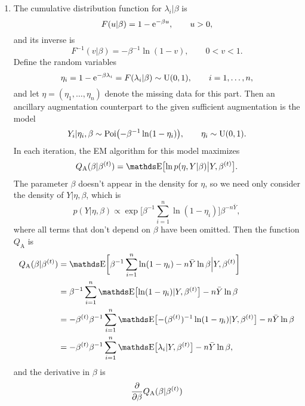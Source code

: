 \begin{enumerate}
\begin{enumerate}
    \item \label{q:aa}
    The cumulative distribution function for $\lambda_i \vert \beta$ is
        \[
        F(u \vert \beta)
        =
        1 - \operatorname{e}^{-\beta u},
        \qquad
        u > 0,
        \]
    and its inverse is
        \[
        F^{-1}(v \vert \beta)
        =
        -\beta^{-1} \ln(1 - v),
        \qquad
        0 < v < 1.
        \]
    Define the random variables
        \[
        \eta_i
        =
        1 - \operatorname{e}^{-\beta \lambda_i}
        =
        F(\lambda_i \vert \beta)
        \sim
        \operatorname{U}(0, 1),
        \qquad
        i = 1, \ldots, n,
        \]
    and let $\eta = (\eta_1, \ldots, \eta_n)$ denote the missing data for this
    part.
    Then an ancillary augmentation counterpart to the given sufficient
    augmentation is the model
        \[
        Y_i \vert \eta_i, \beta \sim 
        \operatorname{Poi} \bigl( -\beta^{-1} \ln(1 - \eta_i) \bigr),
        \qquad
        \eta_i \sim \operatorname{U}(0, 1).
        \]
    In each iteration, the EM algorithm for this model maximizes
        \[
        Q_\mathrm{A}(\beta \vert \beta^{(t)})
        =
        \E \bigl[ 
        \ln p(\eta, Y \vert \beta) \big\vert Y, \beta^{(t)} 
        \bigr].
        \]
    The parameter $\beta$ doesn't appear in the density for $\eta$,
    so we need only consider the density of $Y \vert \eta, \beta$,
    which is
        \[
        p(Y \vert \eta, \beta)
        \propto
        \exp \biggl[ \beta^{-1}\sum_{i=1}^n \ln(1 - \eta_i) \biggr]
        \beta^{-n\bar{Y}},
        \]
    where all terms that don't depend on $\beta$ have been omitted.
    Then the function $Q_\mathrm{A}$ is
        \begin{align*}
        Q_\mathrm{A}(\beta \vert \beta^{(t)})
        &=
        \E \biggl[ 
        \beta^{-1}\sum_{i=1}^n \ln(1 - \eta_i) - n\bar{Y}\ln\beta
        \Big\vert Y, \beta^{(t)} \biggr]
        \\ &=
        \beta^{-1}\sum_{i=1}^n 
        \E\bigl[ \ln(1 - \eta_i) \vert Y, \beta^{(t)} \bigr]
        - n\bar{Y}\ln\beta
        \\ &=
        -\beta^{(t)}\beta^{-1}\sum_{i=1}^n 
        \E\bigl[ -(\beta^{(t)})^{-1}\ln(1 - \eta_i) \vert Y, \beta^{(t)} \bigr]
        - n\bar{Y}\ln\beta
        \\ &=
        -\beta^{(t)}\beta^{-1}
        \sum_{i=1}^n \E\bigl[ \lambda_i \vert Y, \beta^{(t)} \bigr]
        - n\bar{Y}\ln\beta,
        \end{align*}
    and the derivative in $\beta$ is
        \[
        \frac{\partial}{\partial\beta} Q_\mathrm{A}(\beta \vert \beta^{(t)})
\]
\end{enumerate}
\end{enumerate}
